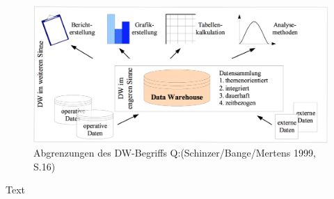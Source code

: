 \begin{figure}[H]
    \centering
    \includegraphics[width=1\textwidth]{files/DWOverview}
    \caption{Abgrenzungen des DW-Begriffs Q:(Schinzer/Bange/Mertens 1999, S.16)}
    \label{pic:DWOverview}
\end{figure}




Text
